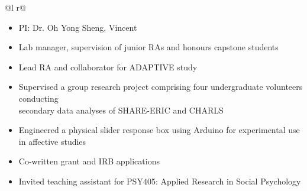 \documentclass[a4paper,12pt]{article}
\begin{document}
\begin{tabularx}{\linewidth}{ @{}l r@{} }
{\begin{minipage}[t]{\linewidth}
\begin{itemize}[nosep, after=\strut, leftmargin=1em, itemsep=3pt]
                \item[--] PI: Dr. Oh Yong Sheng, Vincent
                \item[--] Lab manager, supervision of junior RAs and honours capstone students
                \item[--] Lead RA and collaborator for ADAPTIVE study
                \item[--] Supervised a group research project comprising four undergraduate volunteers conducting\\ secondary data analyses of SHARE-ERIC and CHARLS 
                \item[--] Engineered a physical slider response box using Arduino for experimental use in affective studies
                \item[--] Co-written grant and IRB applications 
                \item[--] Invited teaching assistant for PSY405: Applied Research in Social Psychology
            \end{itemize}
        \end{minipage}
    } \\ 
     \\
     \\
     \\
     \\
     \\
\end{tabularx}
\end{document}
